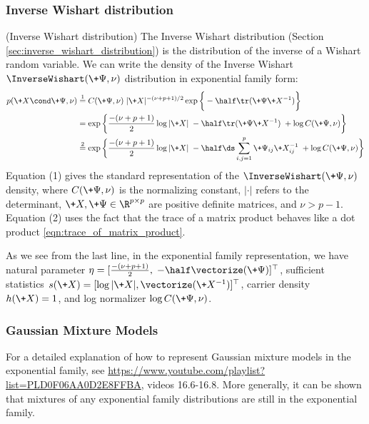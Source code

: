 \documentclass{article} %
\newcommand{\sufficientStatsFunction}{s}
\newcommand{\carrierDensity}{h}
\begin{document}
\subsubsection{Inverse Wishart distribution}

\begin{example}{(Inverse Wishart distribution)} 
\label{ex:inverse_wishart_as_ef} The Inverse Wishart distribution (Section \ref{sec:inverse_wishart_distribution}) is the distribution of the inverse of a Wishart random variable.   We can write the density of the Inverse Wishart $\InverseWishart(\+\Psi,  \nu)$ distribution in exponential family form:
\begin{align*}
p (\+X  \cond \+\Psi,  \nu) & \stackrel{1}{=} C(\+\Psi,  \nu) \; | \+X | ^{-(\nu + p + 1)/2} \exp \bigg\{ -\half \tr (\+\Psi \+X^{-1} ) \bigg\} \\
& = \exp \bigg\{ \frac{-(\nu + p + 1)}{2}  \log | \+ X | \;  -\half \tr (\+\Psi \+X^{-1} )  \; + \log  C(\+\Psi,  \nu)   \bigg\} \\
& \stackrel{2}{=} \exp \bigg\{ \frac{-(\nu + p + 1)}{2}  \log | \+ X | \;  -\half  \ds\sum_{i,j=1}^p \+\Psi_{ij} \+X^{-1}_{ij} \; + \log  C(\+\Psi,  \nu)   \bigg\} 
\end{align*}
Equation (1) gives the standard representation of the $\InverseWishart(\+\Psi,  \nu)$ density,  where   $C(\+\Psi,  \nu)$ is the normalizing constant,  $| \cdot |$ refers to the determinant,  $\+X,  \+\Psi \in \R^{p \times p}$ are positive definite matrices,  and $\nu > p-1$.    Equation (2) uses the fact that the trace of a matrix product behaves like a dot product \eqref{eqn:trace_of_matrix_product}.      


As we see from the last line,  in the exponential family representation,  we have natural parameter $\eta = [\frac{-(\nu + p + 1)}{2},  \; -\half \vectorize (\+\Psi)]^\top$, sufficient statistics $\sufficientStatsFunction(\+X) = [\log | \+X | , \vectorize (\+X^{-1})]^\top$, carrier density $\carrierDensity(\+X)=1$, and log normalizer $ \log  C(\+\Psi,  \nu)$.   
  
\end{example} 


\subsubsection{Gaussian Mixture Models}


For a detailed explanation of how to represent Gaussian mixture models in the exponential family, see \url{https://www.youtube.com/playlist?list=PLD0F06AA0D2E8FFBA}, videos 16.6-16.8. More generally, it can be shown that mixtures of any exponential family distributions are still in the exponential family. 
\end{document}
